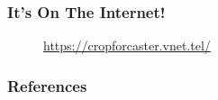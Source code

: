 \documentclass[aspectratio=169]{beamer}
\begin{document}
    \begin{frame}
        \frametitle{It's On The Internet!}

        \begin{figure}
            \caption{\url{https://cropforcaster.vnet.tel/}}
        \end{figure}
    \end{frame}

    \begin{frame}[allowframebreaks]
        \frametitle{References}
        
        \printbibliography
    \end{frame}
\end{document}
